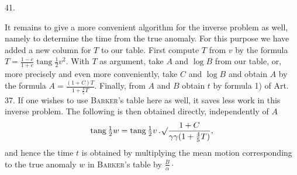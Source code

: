 \par{}
\begin{center}
\hypertarget{native-059-article041}{}41.
\end{center}
It remains to give a more convenient algorithm for the inverse problem as well, namely to determine the time from the true anomaly. For this purpose we have added a new column for $T$ to our table. First compute $T$ from $v$ by the formula $T=\frac{1-e}{1+e}\operatorname{tang}\tfrac{1}{2}v^2$. With $T$ as argument, take $A$ and $\log B$ from our table, or, more precisely and even more conveniently, take $C$ and $\log B$ and obtain $A$ by the formula $A=\frac{(1+C)T}{1+\frac{4}{5}T}$. Finally, from $A$ and $B$ obtain $t$ by formula 1) of Art. 37. If one wishes to use \textsc{Barker}'s table here as well, it saves less work in this inverse problem. The following is then obtained directly, independently of $A$
\[
\operatorname{tang}\tfrac{1}{2}w=\operatorname{tang}\tfrac{1}{2}v\,\mathord{.}\,\mathord{{}^{}\!\surd}\frac{1+C}{\gamma\gamma(1+\frac{4}{5}T)},
\]
and hence the time $t$ is obtained by multiplying the mean motion corresponding to the true anomaly $w$ in \textsc{Barker}'s table by $\frac{B}{\alpha}\cdot$
